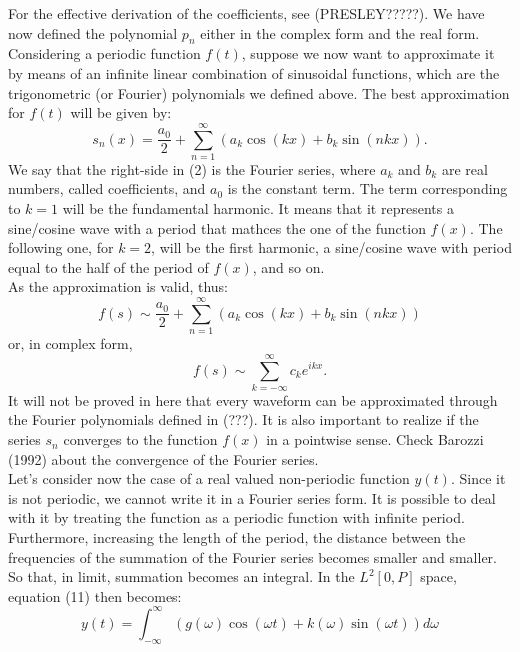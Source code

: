 \documentclass{article}
\begin{document}
For the effective derivation of the coefficients, see (PRESLEY?????). We have now defined the polynomial $p_n$ either in the complex form and the real form.\\
Considering a periodic function $f(t)$, suppose we now want to approximate it by means of an infinite linear combination of sinusoidal functions, which are the trigonometric (or Fourier) polynomials we defined above. The best approximation for $f(t)$ will be given by:
\begin{equation}
s_n(x)=\frac{a_0}{2} + \sum \limits_{n=1}^{\infty}(a_k \cos(kx)+b_k \sin(n kx)).
\end{equation}
We say that the right-side in (2) is the Fourier series, where $a_k$ and $b_k$ are real numbers, called coefficients, and $a_0$ is the constant term. The term corresponding to $k=1$ will be the fundamental harmonic. It means that it represents a sine/cosine wave with a period that mathces the one of the function $f(x)$. The following one, for $k=2$, will be the first harmonic, a sine/cosine wave with period equal to the half of the period of $f(x)$, and so on.\\As the approximation is valid, thus:
\begin{equation}
f(s) \sim \frac{a_0}{2} + \sum \limits_{n=1}^{\infty}(a_k \cos(kx)+b_k \sin(n kx))
\end{equation}
or, in complex form,
\begin{equation}
f(s) \sim \sum_{k=-\infty}^{\infty}c_k e^{ikx}.
\end{equation}
It will not be proved in here that every waveform can be approximated through the Fourier polynomials defined in (???). It is also important to realize if the series $s_n$ converges to the function $f(x)$ in a pointwise sense. Check Barozzi (1992) about the convergence of the Fourier series.\\Let's consider now the case of a real valued non-periodic function $y(t)$. Since it is not periodic, we cannot write it in a Fourier series form. It is possible to deal with it by treating the function as a periodic function with infinite period. Furthermore, increasing the length of the period, the distance between the frequencies of the summation of the Fourier series becomes smaller and smaller. So that, in limit, summation becomes an integral. In the $L^2[0,P]$ space, equation (11) then becomes:
\begin{equation}
y(t)=\int_{-\infty}^{\infty}(g(\omega)\cos(\omega t)+ k(\omega)\sin(\omega t))d\omega
\end{equation}
\end{document}
